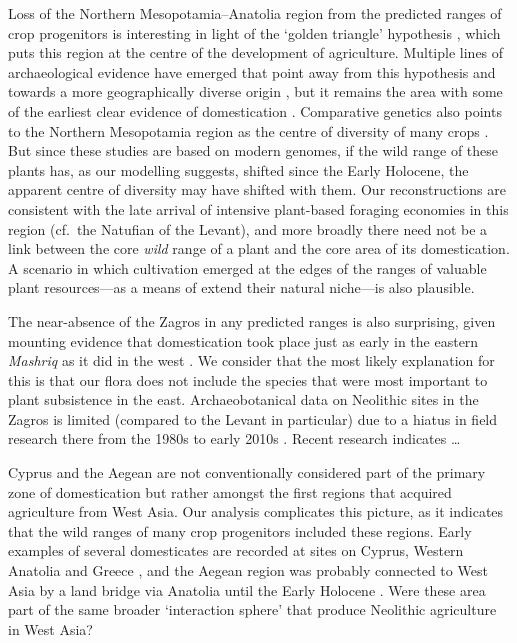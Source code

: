 \documentclass[
  authoryear,
  preprint]{elsarticle}
\begin{document}
Loss of the Northern Mesopotamia--Anatolia region from the predicted
ranges of crop progenitors is interesting in light of the `golden
triangle' hypothesis
\citep{Lev-YadunEtAl2000, KozlowskiAurenche2005, AbboEtAl2010}, which
puts this region at the centre of the development of agriculture.
Multiple lines of archaeological evidence have emerged that point away
from this hypothesis and towards a more geographically diverse origin
\citep{Asouti2006, cites}, but it remains the area with some of the
earliest clear evidence of domestication
\citep{ZoharyEtAl2012, KabukcuEtAl2021, UlasEtAl2024}. Comparative
genetics also points to the Northern Mesopotamia region as the centre of
diversity of many crops \citep[e.g.][]{HaasEtAl2019}. But since these
studies are based on modern genomes, if the wild range of these plants
has, as our modelling suggests, shifted since the Early Holocene, the
apparent centre of diversity may have shifted with them. Our
reconstructions are consistent with the late arrival of intensive
plant-based foraging economies in this region (cf.~the Natufian of the
Levant), and more broadly there need not be a link between the core
\emph{wild} range of a plant and the core area of its domestication. A
scenario in which cultivation emerged at the edges of the ranges of
valuable plant resources---as a means of extend their natural niche---is
also plausible.

The near-absence of the Zagros in any predicted ranges is also
surprising, given mounting evidence that domestication took place just
as early in the eastern \emph{Mashriq} as it did in the west
\citep{Braidwood, GanjDarehGoats, HillyFlanksStuff}. We consider that
the most likely explanation for this is that our flora does not include
the species that were most important to plant subsistence in the east.
Archaeobotanical data on Neolithic sites in the Zagros is limited
(compared to the Levant in particular) due to a hiatus in field research
there from the 1980s to early 2010s \citep{cite}. Recent research
\citep{Amaia} indicates \ldots{}

Cyprus and the Aegean are not conventionally considered part of the
primary zone of domestication but rather amongst the first regions that
acquired agriculture from West Asia. Our analysis complicates this
picture, as it indicates that the wild ranges of many crop progenitors
included these regions. Early examples of several domesticates are
recorded at sites on Cyprus, Western Anatolia and Greece
\citep{ArranzOtaeguiRoe2023}, and the Aegean region was probably
connected to West Asia by a land bridge via Anatolia until the Early
Holocene \citep{AksuHiscott2022}. Were these area part of the same
broader `interaction sphere' \citep{cite} that produce Neolithic
agriculture in West Asia?
\end{document}
